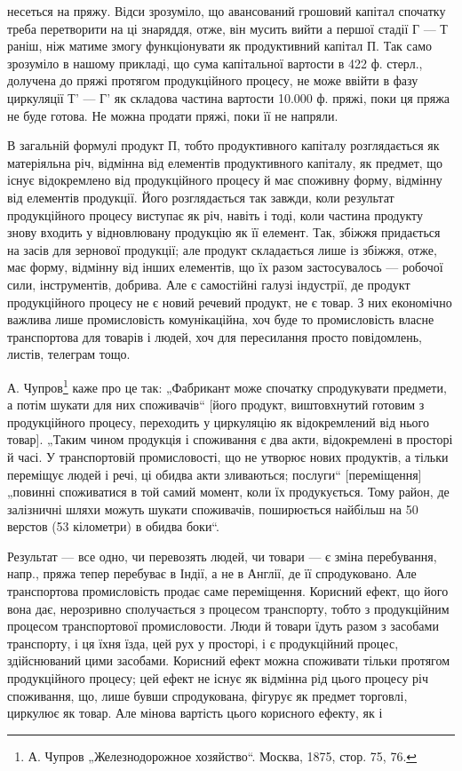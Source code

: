 несеться на пряжу. Відси зрозуміло, що авансований грошовий капітал
спочатку треба перетворити на ці знаряддя, отже, він мусить вийти а
першої стадії Г — Т раніш, ніж матиме змогу функціонувати як продуктивний
капітал П. Так само зрозуміло в нашому прикладі, що сума
капітальної вартости в 422 ф. стерл., долучена до пряжі протягом продукційного
процесу, не може ввійти в фазу циркуляції Т' — Г' як складова
частина вартости 10.000 ф. пряжі, поки ця пряжа не буде готова.
Не можна продати пряжі, поки її не напряли.

В загальній формулі продукт П, тобто продуктивного капіталу розглядається
як матеріяльна річ, відмінна від елементів продуктивного капіталу, як
предмет, що існує відокремлено від продукційного процесу й має споживну
форму, відмінну від елементів продукції. Його розглядається так завжди, коли
результат продукційного процесу виступає як річ, навіть і тоді, коли частина
продукту знову входить у відновлювану продукцію як її елемент. Так,
збіжжя придається на засів для зернової продукції; але продукт складається
лише із збіжжя, отже, має форму, відмінну від інших елементів, що
їх разом застосувалось — робочої сили, інструментів, добрива. Але є
самостійні галузі індустрії, де продукт продукційного процесу не є
новий речевий продукт, не є товар. З них економічно важлива лише
промисловість комунікаційна, хоч буде то промисловість власне транспортова
для товарів і людей, хоч для пересилання просто повідомлень,
листів, телеграм тощо.

А. Чупров\footnote{
А. Чупров „Железнодорожное хозяйство“. Москва, 1875, стор. 75, 76.
} каже про це так: „Фабрикант може спочатку спродукувати
предмети, а потім шукати для них споживачів“ [його продукт, виштовхнутий
готовим з продукційного процесу, переходить у циркуляцію як
відокремлений від нього товар]. „Таким чином продукція і споживання є
два акти, відокремлені в просторі й часі. У транспортовій промисловості,
що не утворює нових продуктів, а тільки переміщує людей і речі, ці
обидва акти зливаються; послуги“ [переміщення] „повинні споживатися в
той самий момент, коли їх продукується. Тому район, де залізничні шляхи
можуть шукати споживачів, поширюється найбільш на 50 верстов
(53 кілометри) в обидва боки“.

Результат — все одно, чи перевозять людей, чи товари — є зміна перебування,
напр., пряжа тепер перебуває в Індії, а не в Англії, де її спродуковано.
Але транспортова промисловість продає саме переміщення. Корисний
ефект, що його вона дає, нерозривно сполучається з процесом транспорту,
тобто з продукційним процесом транспортової промисловости.
Люди й товари їдуть разом з засобами транспорту, і ця їхня їзда, цей
рух у просторі, і є продукційний процес, здійснюваний цими засобами. Корисний
ефект можна споживати тільки протягом продукційного процесу;
цей ефект не існує як відмінна рід цього процесу річ споживання,
що, лише бувши спродукована, фігурує як предмет торговлі,
циркулює як товар. Але мінова вартість цього корисного ефекту, як і